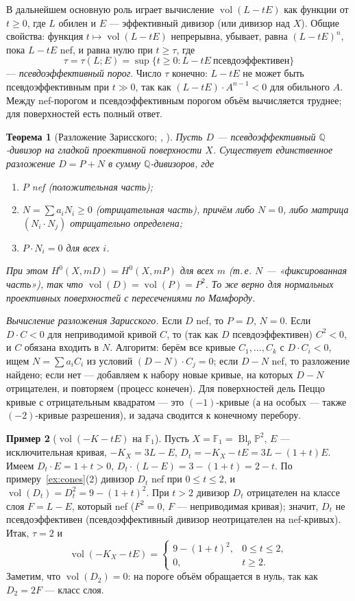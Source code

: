 \documentclass[11pt,a4paper]{article}
\theoremstyle{plain}
\newtheorem{theorem}{Теорема}[section]
\theoremstyle{definition}
\newtheorem{example}[theorem]{Пример}
\theoremstyle{remark}
\newcommand{\Q}{\mathbb{Q}}
\newcommand{\PP}{\mathbb{P}}
\DeclareMathOperator{\Bl}{Bl}
\DeclareMathOperator{\vol}{vol}
\begin{document}
В дальнейшем основную роль играет вычисление $\vol(L-tE)$ как функции от $t\ge0$, где $L$ обилен и $E$
--- эффективный дивизор (или дивизор над $X$). Общие свойства: функция $t\mapsto\vol(L-tE)$
непрерывна, убывает, равна $(L-tE)^n$, пока $L-tE$ nef, и равна нулю при $t\ge\tau$, где
\[
\tau=\tau(L;E)=\sup\{t\ge0: L-tE\ \text{псевдоэффективен}\}
\]
--- \emph{псевдоэффективный порог}. Число $\tau$ конечно: $L-tE$ не может быть псевдоэффективным
при $t\gg0$, так как $(L-tE)\cdot A^{n-1}<0$ для обильного $A$. Между nef-порогом и
псевдоэффективным порогом объём вычисляется труднее; для поверхностей есть полный ответ.

\begin{theorem}[{Разложение Зарисского; \cite[2.3.19]{La}, \cite{Zar}}]\label{thm:Zariski}
Пусть $D$ --- псевдоэффективный $\Q$-дивизор на гладкой проективной поверхности $X$. Существует
единственное разложение $D=P+N$ в сумму $\Q$-дивизоров, где
\begin{enumerate}
\item $P$ nef \textup{(}\emph{положительная часть}\textup{)};
\item $N=\sum a_iN_i\ge0$ \textup{(}\emph{отрицательная часть}\textup{)}, причём либо $N=0$, либо матрица
$(N_i\cdot N_j)$ отрицательно определена;
\item $P\cdot N_i=0$ для всех $i$.
\end{enumerate}
При этом $H^0(X,mD)=H^0(X,mP)$ для всех $m$ \textup{(}т.\,е. $N$ --- «фиксированная часть»\textup{)}, так что
$\vol(D)=\vol(P)=P^2$. То же верно для нормальных проективных поверхностей с пересечениями по
Мамфорду.
\end{theorem}

\emph{Вычисление разложения Зарисского.} Если $D$ nef, то $P=D$, $N=0$. Если $D\cdot C<0$ для неприводимой кривой
$C$, то (так как $D$ псевдоэффективен) $C^2<0$, и $C$ обязана входить в $N$. Алгоритм: берём
все кривые $C_1,\dots,C_k$ с $D\cdot C_i<0$, ищем $N=\sum a_iC_i$ из условий $(D-N)\cdot C_j=0$;
если $D-N$ nef, то разложение найдено; если нет --- добавляем к набору новые кривые, на которых $D-N$
отрицателен, и повторяем (процесс конечен). Для поверхностей дель Пеццо кривые с отрицательным
квадратом --- это $(-1)$-кривые (а на особых --- также $(-2)$-кривые разрешения), и задача сводится
к конечному перебору.

\begin{example}[$\vol(-K-tE)$ на $\mathbb F_1$]\label{ex:vol-F1}
Пусть $X=\mathbb F_1=\Bl_p\PP^2$, $E$ --- исключительная кривая, $-K_X=3L-E$,
$D_t=-K_X-tE=3L-(1+t)E$. Имеем $D_t\cdot E=1+t>0$, $D_t\cdot(L-E)=3-(1+t)=2-t$. По
примеру~\ref{ex:cones}(2) дивизор $D_t$ nef при $0\le t\le2$, и $\vol(D_t)=D_t^2=9-(1+t)^2$.
При $t>2$ дивизор $D_t$ отрицателен на классе слоя $F=L-E$, который nef ($F^2=0$,
$F$ --- неприводимая кривая); значит, $D_t$ не псевдоэффективен (псевдоэффективный дивизор
неотрицателен на nef-кривых). Итак, $\tau=2$ и
\[
\vol(-K_X-tE)=\begin{cases}9-(1+t)^2,&0\le t\le2,\\0,&t\ge2.\end{cases}
\]
Заметим, что $\vol(D_2)=0$: на пороге объём обращается в нуль, так как $D_2=2F$ --- класс слоя.
\end{example}
\end{document}
